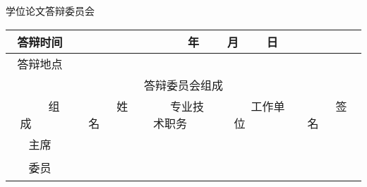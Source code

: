 \begin{titlepage}

    \begin{center}
        \setlength{\parskip}{24pt}
        \heiti 学位论文答辩委员会
        \setlength{\parskip}{18pt}
    \end{center}
    
    \noindent
    \begin{table}[htbp]
        \centering
        \renewcommand\arraystretch{2}
        \begin{tabular}{|c|c|c|c|c|}
            \hline
            答辩时间 & \multicolumn{4}{c|}{ ~~~~ 年 ~~~ 月 ~~~ 日} \\ 
            \hline
            答辩地点 & \multicolumn{4}{c|}{}\\ 
            \hline
            \multicolumn{5}{|c|}{~~~~~~答辩委员会组成~~~~~~}\\ 
            \hline
            ~~~~~组成~~~~~ & ~~~~~姓名~~~~~ & ~~~专业技术职务~~~ & ~~~~~工作单位~~~~~ & ~~~~~签名~~~~~ \\ \hline
            主席 & & & & \\ \hline
            \multirow{6}{*}{委员} & & & & \\
            \cline{2-5}
             & & & & \\ 
            \cline{2-5}
             & & & & \\ 
            \cline{2-5}
             & & & & \\
            \cline{2-5}
             & & & & \\ 
            \cline{2-5}
             & & & & \\ 
            \hline
        \end{tabular}
    \end{table}
    
    \end{titlepage}
    
